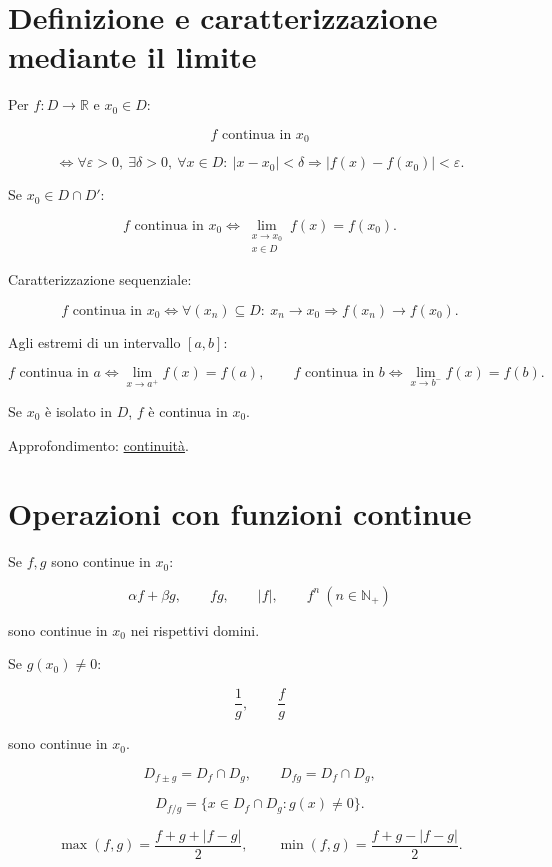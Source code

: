 \section{Definizione e caratterizzazione mediante il limite}\label{definizione-e-caratterizzazione-mediante-il-limite}

Per \(f:D\to\mathbb R\) e \(x_0\in D\):

\[
f\text{ continua in }x_0
\]

\[
\Longleftrightarrow
\forall\varepsilon>0,\ \exists\delta>0,\ \forall x\in D:\
|x-x_0|<\delta
\Rightarrow
|f(x)-f(x_0)|<\varepsilon.
\]

Se \(x_0\in D\cap D'\):

\[
f\text{ continua in }x_0
\Longleftrightarrow
\lim_{\substack{x\to x_0\\x\in D}}f(x)=f(x_0).
\]

Caratterizzazione sequenziale:

\[
f\text{ continua in }x_0
\Longleftrightarrow
\forall(x_n)\subseteq D:\ x_n\to x_0
\Rightarrow
f(x_n)\to f(x_0).
\]

Agli estremi di un intervallo \([a,b]\):

\[
f\text{ continua in }a
\Longleftrightarrow
\lim_{x\to a^+}f(x)=f(a),
\qquad
f\text{ continua in }b
\Longleftrightarrow
\lim_{x\to b^-}f(x)=f(b).
\]

Se \(x_0\) è isolato in \(D\), \(f\) è continua in \(x_0\).

Approfondimento: \href{https://ingegnerismo.it/matematica/continuita/}{continuità}.

\section{Operazioni con funzioni continue}\label{operazioni-con-funzioni-continue}

Se \(f,g\) sono continue in \(x_0\):

\[
\alpha f+\beta g,
\qquad
fg,
\qquad
|f|,
\qquad
f^n\ (n\in\mathbb N_+)
\]

sono continue in \(x_0\) nei rispettivi domini.

Se \(g(x_0)\ne0\):

\[
\frac1g,
\qquad
\frac fg
\]

sono continue in \(x_0\).

\[
D_{f\pm g}=D_f\cap D_g,
\qquad
D_{fg}=D_f\cap D_g,
\]

\[
D_{f/g}=\{x\in D_f\cap D_g:g(x)\ne0\}.
\]

\[
\max(f,g)=\frac{f+g+|f-g|}{2},
\qquad
\min(f,g)=\frac{f+g-|f-g|}{2}.
\]

